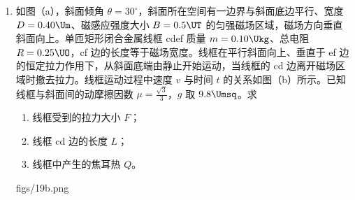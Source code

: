 \documentclass[\gkver]{gaokaozhenti}
\begin{document}
\begin{enumerate}
{（2）设挡光片宽度为 $d$，挡光时间为 $\Delta t$，则小车经过光电门时的速度 $v = \frac{d}{\Delta t}$。小车从静止开始做匀加速直线运动，设释放时小车与光电门的距离为 $L$，由 $v^{2} = 2aL$ 得

$a = \frac{d^{2}}{2L(\Delta t)^{2}}$

所以还需要测量挡光片的宽度和光电门到小车的距离。

（3）钩码随小车一起做加速运动，加速度向下，由牛顿第二定律 $mg - T = ma$ 可知，细线的拉力 $T$ 小于钩码的重力 $mg$。

（4）滑轮位置偏低时，细线对小车的拉力斜向下，拉力沿轨道方向的分力小于拉力；拉力垂直轨道向下的分力还使小车对轨道的压力增大、受到的摩擦力增大。所以小车沿轨道方向的合力减小，加速度减小，$a_{1} > a_{2}$，选 B。
}

\item
如图（a），斜面倾角 $\theta = 30^{\circ}$，斜面所在空间有一边界与斜面底边平行、宽度 $D = 0.40 \Um$、磁感应强度大小 $B = 0.5 \UT$ 的匀强磁场区域，磁场方向垂直斜面向上。单匝矩形闭合金属线框 cdef 质量 $m = 0.10 \Ukg$、总电阻 $R = 0.25 \UO$，cf 边的长度等于磁场宽度。线框在平行斜面向上、垂直于 ef 边的恒定拉力作用下，从斜面底端由静止开始运动，当线框的 cd 边离开磁场区域时撤去拉力。线框运动过程中速度 $v$ 与时间 $t$ 的关系如图（b）所示。已知线框与斜面间的动摩擦因数 $\mu = \frac{\sqrt{3}}{3}$，$g$ 取 $9.8 \Umsq$。求
\begin{enumerate}
	\item
	线框受到的拉力大小 $F$；
	\item
	线框 cd 边的长度 $L$；
	\item
	线框中产生的焦耳热 $Q$。
\end{enumerate}
{figs/19b.png}
\end{enumerate}
\end{document}
